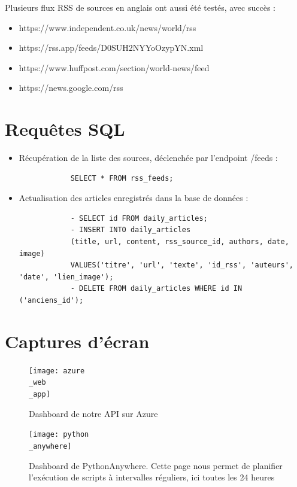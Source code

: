 \documentclass[french]{article}
\begin{document}
    Plusieurs flux RSS de sources en anglais ont aussi été testés, avec succès :
    \begin{itemize}
        \item https://www.independent.co.uk/news/world/rss
        \item https://rss.app/feeds/D0SUH2NYYoOzypYN.xml
        \item https://www.huffpost.com/section/world-news/feed
        \item https://news.google.com/rss
    \end{itemize}
    \section*{Requêtes SQL}
    \begin{itemize}
        \item Récupération de la liste des sources, déclenchée par l'endpoint /feeds : 
        \begin{verbatim}
            SELECT * FROM rss_feeds;
        \end{verbatim}
        \item Actualisation des articles enregistrés dans la base de données :
        \begin{verbatim}
            - SELECT id FROM daily_articles;
            - INSERT INTO daily_articles
            (title, url, content, rss_source_id, authors, date, image) 
            VALUES('titre', 'url', 'texte', 'id_rss', 'auteurs', 'date', 'lien_image');
            - DELETE FROM daily_articles WHERE id IN ('anciens_id');
        \end{verbatim}
    \end{itemize}
    \section*{Captures d'écran}
    \begin{figure}[h]
        \texttt{[image: azure\\\_web\\\_app]}
        \centering
        \caption{Dashboard de notre API sur Azure}
        \centering
    \end{figure}
    \begin{figure}[h]
        \texttt{[image: python\\\_anywhere]}
        \centering
        \caption{Dashboard de PythonAnywhere. Cette page nous permet de planifier l'exécution de scripts à intervalles réguliers, ici toutes les 24 heures}
        \centering
    \end{figure}
\end{document}
